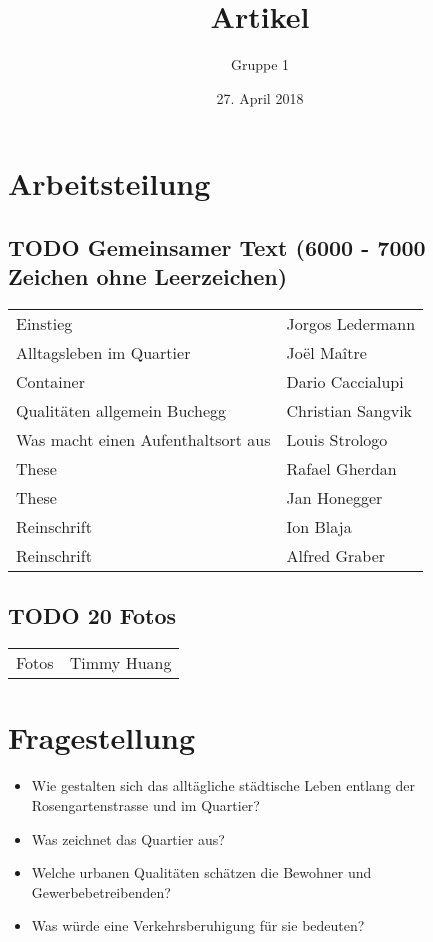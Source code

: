 \documentclass[a4paper,ngerman,11pt]{scrartcl}
\author{Gruppe 1}
\date{27. April 2018}
\title{Artikel}
\begin{document}
\maketitle
\tableofcontents



\section{Arbeitsteilung}
\label{sec-1}

\subsection{{\bfseries\sffamily TODO} Gemeinsamer Text (6000 - 7000 Zeichen ohne Leerzeichen)}
\label{sec-1-1}

\begin{center}
\begin{tabular}{ll}
Einstieg & Jorgos Ledermann\\
Alltagsleben im Quartier & Joël Maître\\
Container & Dario Caccialupi\\
Qualitäten allgemein  Buchegg & Christian Sangvik\\
Was macht einen Aufenthaltsort aus & Louis Strologo\\
These & Rafael Gherdan\\
These & Jan Honegger\\
Reinschrift & Ion Blaja\\
Reinschrift & Alfred Graber\\
\end{tabular}
\end{center}


\subsection{{\bfseries\sffamily TODO} 20 Fotos}
\label{sec-1-2}

\begin{center}
\begin{tabular}{ll}
Fotos & Timmy Huang\\
\end{tabular}
\end{center}

\section{Fragestellung}
\label{sec-2}

\begin{itemize}
\item Wie gestalten sich das alltägliche städtische Leben entlang der
Rosengartenstrasse und im Quartier?

\item Was zeichnet das Quartier aus?

\item Welche urbanen Qualitäten schätzen die Bewohner und Gewerbebetreibenden?

\item Was würde eine Verkehrsberuhigung für sie bedeuten?
\end{itemize}
\end{document}
